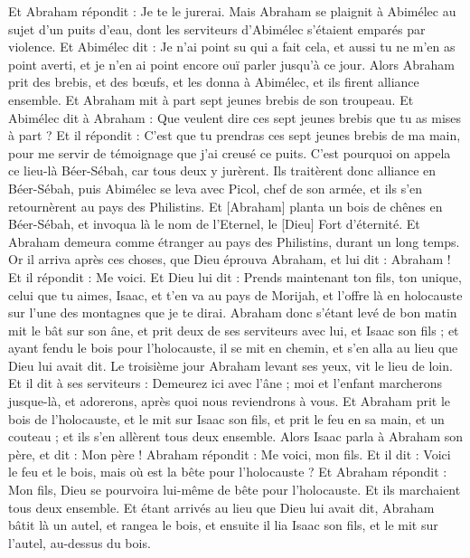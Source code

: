 \begin{multicols}{2}
Et Abraham répondit : Je te le jurerai.
Mais Abraham se plaignit à Abimélec au sujet d'un puits d'eau, dont les serviteurs d'Abimélec s'étaient emparés par violence.
Et Abimélec dit : Je n'ai point su qui a fait cela, et aussi tu ne m'en as point averti, et je n'en ai point encore ouï parler jusqu'à ce jour.
Alors Abraham prit des brebis, et des bœufs, et les donna à Abimélec, et ils firent alliance ensemble.
Et Abraham mit à part sept jeunes brebis de son troupeau.
Et Abimélec dit à Abraham : Que veulent dire ces sept jeunes brebis que tu as mises à part ?
Et il répondit : C'est que tu prendras ces sept jeunes brebis de ma main, pour me servir de témoignage que j'ai creusé ce puits.
C'est pourquoi on appela ce lieu-là Béer-Sébah, car tous deux y jurèrent.
Ils traitèrent donc alliance en Béer-Sébah, puis Abimélec se leva avec Picol, chef de son armée, et ils s'en retournèrent au pays des Philistins.
Et [Abraham] planta un bois de chênes en Béer-Sébah, et invoqua là le nom de l'Eternel, le [Dieu] Fort d'éternité.
Et Abraham demeura comme étranger au pays des Philistins, durant un long temps.
\VerseOne{}Or il arriva après ces choses, que Dieu éprouva Abraham, et lui dit : Abraham ! Et il répondit : Me voici.
Et Dieu lui dit : Prends maintenant ton fils, ton unique, celui que tu aimes, Isaac, et t'en va au pays de Morijah, et l'offre là en holocauste sur l'une des montagnes que je te dirai.
Abraham donc s'étant levé de bon matin mit le bât sur son âne, et prit deux de ses serviteurs avec lui, et Isaac son fils ; et ayant fendu le bois pour l'holocauste, il se mit en chemin, et s'en alla au lieu que Dieu lui avait dit.
Le troisième jour Abraham levant ses yeux, vit le lieu de loin.
Et il dit à ses serviteurs : Demeurez ici avec l'âne ; moi et l'enfant marcherons jusque-là, et adorerons, après quoi nous reviendrons à vous.
Et Abraham prit le bois de l'holocauste, et le mit sur Isaac son fils, et prit le feu en sa main, et un couteau ; et ils s'en allèrent tous deux ensemble.
Alors Isaac parla à Abraham son père, et dit : Mon père ! Abraham répondit : Me voici, mon fils. Et il dit : Voici le feu et le bois, mais où est la bête pour l'holocauste ?
Et Abraham répondit : Mon fils, Dieu se pourvoira lui-même de bête pour l'holocauste. Et ils marchaient tous deux ensemble.
Et étant arrivés au lieu que Dieu lui avait dit, Abraham bâtit là un autel, et rangea le bois, et ensuite il lia Isaac son fils, et le mit sur l'autel, au-dessus du bois.

\end{multicols}
